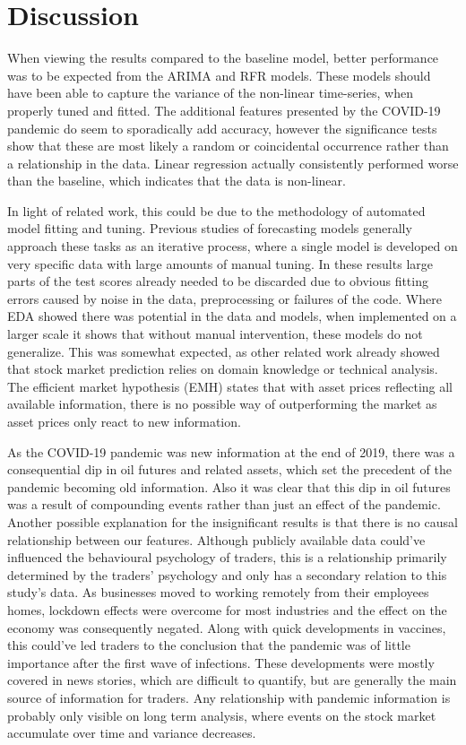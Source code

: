 \section{Discussion}
\label{sec:dis}
When viewing the results compared to the baseline model, better performance was to be expected from the ARIMA and RFR models. These models should have been able to capture the variance of the non-linear time-series, when properly tuned and fitted. The additional features presented by the COVID-19 pandemic do seem to sporadically add accuracy, however the significance tests show that these are most likely a random or coincidental occurrence rather than a relationship in the data. Linear regression actually consistently performed worse than the baseline, which indicates that the data is non-linear.

In light of related work, this could be due to the methodology of automated model fitting and tuning. Previous studies of forecasting models generally approach these tasks as an iterative process, where a single model is developed on very specific data with large amounts of manual tuning. In these results large parts of the test scores already needed to be discarded due to obvious fitting errors caused by noise in the data, preprocessing or failures of the code. Where EDA showed there was potential in the data and models, when implemented on a larger scale it shows that without manual intervention, these models do not generalize. This was somewhat expected, as other related work already showed that stock market prediction relies on domain knowledge or technical analysis. The efficient market hypothesis (EMH) states that with asset prices reflecting all available information, there is no possible way of outperforming the market as asset prices only react to new information. 

As the COVID-19 pandemic was new information at the end of 2019, there was a consequential dip in oil futures and related assets, which set the precedent of the pandemic becoming old information. Also it was clear that this dip in oil futures was a result of compounding events rather than just an effect of the pandemic. Another possible explanation for the insignificant results is that there is no causal relationship between our features. Although publicly available data could've influenced the behavioural psychology of traders, this is a relationship primarily determined by the traders' psychology and only has a secondary relation to this study's data. As businesses moved to working remotely from their employees homes, lockdown effects were overcome for most industries and the effect on the economy was consequently negated. Along with quick developments in vaccines, this could've led traders to the conclusion that the pandemic was of little importance after the first wave of infections. These developments were mostly covered in news stories, which are difficult to quantify, but are generally the main source of information for traders. Any relationship with pandemic information is probably only visible on long term analysis, where events on the stock market accumulate over time and variance decreases.

